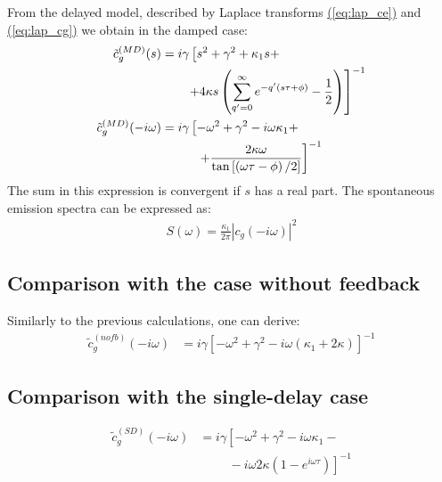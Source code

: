 \documentclass[%
 reprint,
 amsmath,amssymb,
pra,
]{revtex4-1}
\def\qp{{q^\prime}}
\def\qp{{q^\prime}}
\def\kappap{{\kappa^\prime}}
\def\ctil{\tilde{c}}
\def\nn{\nonumber}
\newcommand{\lsz}{\left[}
\newcommand{\rsz}{\right]}
\newcommand{\lk}{\left(}
\newcommand{\rk}{\right)}
\def\refeq#1{{\hyperref[#1]{(\ref*{#1})}}}
\newcommand\note[1]{{\color{red}{#1}}}
\begin{document}
From the delayed model, described by Laplace transforms \refeq{eq:lap_ce} and \refeq{eq:lap_cg} we obtain in the damped case:
\begin{align}
\ctil_g^{(MD)}(s) &= i\gamma\lsz s^2+\gamma^2+\kappa_1s +\right.\nn\\
&\hspace{.7cm}\left.+ 4\kappa s\lk\sum_{\qp=0}^\infty e^{-\qp(s\tau+\phi)}-\frac{1}{2}\rk\rsz^{-1} \nn\\
\ctil_g^{(MD)}(-i\omega)&=i\gamma\lsz -\omega^2+\gamma^2-i\omega\kappa_1 +\right.\nn\\
&\hspace{1cm}\left.+ \frac{2\kappa\omega}{\tan{\lsz\lk\omega\tau-\phi\rk/2\rsz}}\rsz^{-1}
\end{align}
The sum in this expression is convergent if $s$ has a real part. \note{So does it converge or not?} 
The spontaneous emission spectra can be expressed as:
\begin{align}
S(\omega) = \frac{\kappa_1}{2\pi}\left| c_g(-i\omega)\right|^2
\end{align}

\subsection{Comparison with the case without feedback}
Similarly to the previous calculations, one can derive:
\begin{align}
\ctil_g^{(nofb)}(-i\omega)&=i\gamma\lsz -\omega^2+\gamma^2-i\omega(\kappa_1+2\kappa)\rsz^{-1}
\end{align}
\subsection{Comparison with the single-delay case}
\begin{align}
\ctil_g^{(SD)}(-i\omega)&=i\gamma\lsz -\omega^2+\gamma^2-i\omega\kappa_1-\right.\nn\\
&\left.\hspace{1cm}-i\omega2\kappa\lk1-e^{i\omega\tau}\rk\rsz^{-1}
\end{align}

\end{document}
